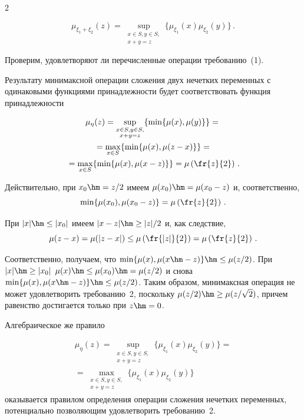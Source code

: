 \begin{multicols}{2}
\begin{itemize}
  \noindent
  $$
  \mu_{\xi_1+\xi_2}(z)= 
\sup\limits_{\substack{{x\in S, y\in S,}\\{x+y=z}}} 
\{\mu_{\xi_1}(x)\mu_{\xi_2}(y)\}\,.
$$
  \end{itemize}
  
  Проверим, удовлетворяют ли перечисленные операции требованию~(1).
  
  Результату минимаксной операции сложения двух нечетких переменных с 
одинаковыми функциями принадлежности будет соответствовать функция 
принадлежности 

\noindent
\begin{multline*}
\mu_\eta(z) = \sup\limits_{\substack{{x\in S, y\in S,}\\{x+y=z}}}\{\min\{\mu(x),\mu(y)\}\}={}\\
{}=
\max\limits_{x\in  S}\{\min\{\mu(x),\mu(z-x)\}\}={}\\
{}= \max\limits_{x\in S}\{\min\{\mu(x),\mu(x-z)\}\}=\mu\left(\fr{z}{2}\right)\,.
\end{multline*}

Действительно, при $x_0\hm=z/2$ имеем 
$\mu(x_0)\hm=\mu(x_0-z)$ и, соответственно, 
$$
\min\{\mu(x_0),\mu(x_0- z)\}=\mu\left(\fr{z}{2}\right)\,.
$$ 


При $\vert x\vert \hm\leq \vert x_0\vert$ имеем $\vert x-z\vert 
\hm\geq \vert z\vert /2$ и, как следствие, 
$$
\mu(z-x)=\mu(\vert z-x\vert ) \leq  \mu\left(\fr{\vert z\vert}{2}\right)=\mu\left(\fr{z}{2}\right)\,.
$$

Соответственно, получаем, что 
$\min\{\mu(x),\mu(x\hm-z)\}\hm\leq \mu(z/2)$. При $\vert x\vert \hm\geq \vert 
x_0\vert$ $\mu(x)\hm\leq \mu(x_0)\hm=\mu(z/2)$ и снова $\min\{\mu(x),\mu(x\hm-
z)\}\hm\leq \mu(z/2)$. Таким образом, минимаксная операция не может 
удовлетворить требованию~2, поскольку $\mu(z/2)\hm\geq \mu(z/\sqrt{2})$, причем 
равенство достигается только при $z\hm=0$.
  
  Алгебраическое же правило 
  
  \noindent
  \begin{multline*}
  \mu_\eta(z) =\sup\limits_{\substack{{x\in S, 
y\in S,}\\{x+y=z}}}\{\mu_{\xi_1}(x)\mu_{\xi_2}(y)\} = {}\\
{}=
\max\limits_{\substack{{x\in S, y\in S,}\\{x+y=z}}}\{\mu_{\xi_1}(x) 
\mu_{\xi_2}(y)\}
\end{multline*} 
оказывается правилом определения операции сложения 
нечетких переменных, потенциально позволяющим удовлетворить 
требованию~2.
  

\end{multicols}
